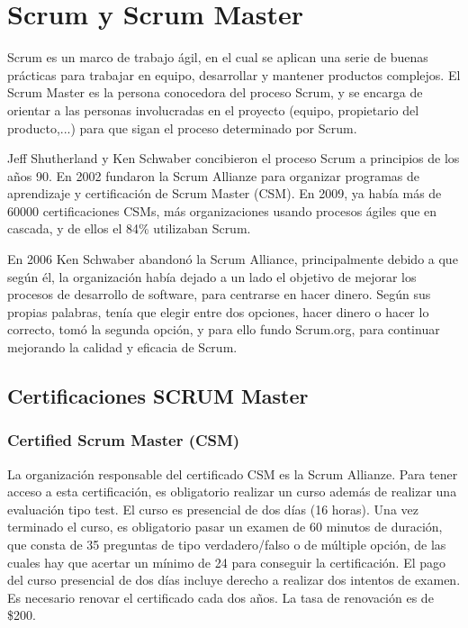 \newpage{}
\section{Scrum y Scrum Master}

Scrum es un marco de trabajo ágil, en el cual se aplican una serie de buenas prácticas para trabajar en equipo, desarrollar y mantener productos complejos. El Scrum Master es la persona conocedora del proceso Scrum, y se encarga de orientar a las personas involucradas en el proyecto (equipo, propietario del producto,...) para que sigan el proceso determinado por Scrum.

Jeff Shutherland y Ken Schwaber concibieron el proceso Scrum a principios de los años 90. En 2002 fundaron la Scrum Allianze para organizar programas de aprendizaje y certificación de Scrum Master (CSM). En 2009, ya había más de 60000 certificaciones CSMs, más organizaciones usando procesos ágiles que en cascada, y de ellos el 84\% utilizaban Scrum.

En 2006 Ken Schwaber abandonó la Scrum Alliance, principalmente debido a que según él, la organización había dejado a un lado el objetivo de mejorar los procesos de desarrollo de software, para centrarse en hacer dinero. Según sus propias palabras, tenía que elegir entre dos opciones, hacer dinero o hacer lo correcto, tomó la segunda opción, y para ello fundo Scrum.org, para continuar mejorando la calidad y eficacia de Scrum.

\subsection{Certificaciones SCRUM Master}


\subsubsection{Certified Scrum Master (CSM)}

La organización responsable del certificado CSM es la Scrum Allianze. Para tener acceso a esta certificación, es obligatorio realizar un curso además de realizar una evaluación tipo test. El curso es presencial de dos días (16 horas). Una vez terminado el curso, es obligatorio pasar un examen de 60 minutos de duración, que consta de 35 preguntas de tipo verdadero/falso o de múltiple opción, de las cuales hay que acertar un mínimo de 24 para conseguir la certificación. El pago del curso presencial de dos días incluye derecho a realizar dos intentos de examen. Es necesario renovar el certificado cada dos años. La tasa de renovación es de \$200.


